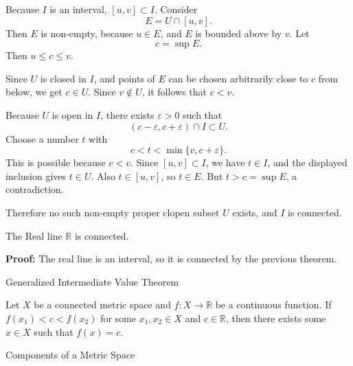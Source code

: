 \documentclass[12pt, a4paper]{article}
\begin{document}
Because \(I\) is an interval, \([u,v]\subset I\).  Consider
\[
E=U\cap [u,v].
\]
Then \(E\) is non-empty, because \(u\in E\), and \(E\) is bounded above by \(v\).  Let
\[
c=\sup E.
\]
Then \(u\le c\le v\).

Since \(U\) is closed in \(I\), and points of \(E\) can be chosen arbitrarily close to \(c\) from below, we get \(c\in U\).  Since \(v\notin U\), it follows that \(c<v\).

Because \(U\) is open in \(I\), there exists \(\varepsilon>0\) such that
\[
(c-\varepsilon,c+\varepsilon)\cap I\subset U.
\]
Choose a number \(t\) with
\[
c<t<\min\{v,c+\varepsilon\}.
\]
This is possible because \(c<v\).  Since \([u,v]\subset I\), we have \(t\in I\), and the displayed inclusion gives \(t\in U\).  Also \(t\in[u,v]\), so \(t\in E\).  But \(t>c=\sup E\), a contradiction.

Therefore no such non-empty proper clopen subset \(U\) exists, and \(I\) is connected.

\vspace{50pt}
    
\begin{theorem}
    The Real line \(\mathbb{R}\) is connected.
\end{theorem}

\vspace{10pt}

\textbf{Proof:}  The real line is an interval, so it is connected by the previous theorem.

\clearpage

\begin{heading}
    Generalized Intermediate Value Theorem
\end{heading}

\vspace{10pt}

\begin{theorem}
    Let \(X\) be a connected metric space and \(f: X \to \mathbb{R}\) be a continuous function. If \(f(x_1) < c < f(x_2)\) for some \(x_1, x_2 \in X\) and \(c \in \mathbb{R}\), then there exists some \(x \in X\) such that \(f(x) = c\).
\end{theorem}

\clearpage

\begin{heading}
    Components of a Metric Space
\end{heading}

\vspace{10pt}
\end{document}
